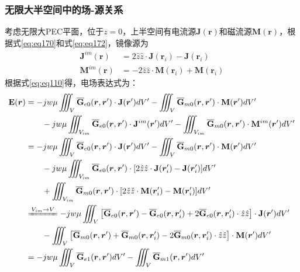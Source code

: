 \documentclass{article}
\numberwithin{equation}{section}
\renewcommand{\vec}[1]{\boldsymbol{#1}}
\begin{document}
\subsubsection{无限大半空间中的场-源关系}
考虑无限大PEC平面，位于$z=0$，上半空间有电流源$\mathbf{J}(\vec{r})$和磁流源$\mathbf{M}(\vec{r})$，根据式\ref{eq:eq170}和式\ref{eq:eq172}，镜像源为
\begin{align}
    \label{eq:eq177}
    \mathbf{J}^{im}(\vec{r})&=2\hat{z}\hat{z}\cdot\mathbf{J}(\vec{r}_i)-\mathbf{J}(\vec{r}_i) \\
    \label{eq:eq178}
    \mathbf{M}^{im}(\vec{r})&=-2\hat{z}\hat{z}\cdot\mathbf{M}(\vec{r}_i)+\mathbf{M}(\vec{r}_i)
\end{align}
根据式\ref{eq:eq110}得，电场表达式为：
\begin{align}
    \label{eq:eq179}
    \mathbf{E}(\vec{r})&=-jw\mu\iiint_V\overline{\mathbf{G}}_{e0}(\vec{r},\vec{r}')\cdot \mathbf{J}(\vec{r}')dV'-\iiint_V\overline{\mathbf{G}}_{m0}(\vec{r},\vec{r}')\cdot \mathbf{M}(\vec{r}')dV' \nonumber \\
                       &\qquad-jw\mu\iiint_{V_{im}}\overline{\mathbf{G}}_{e0}(\vec{r},\vec{r}')\cdot \mathbf{J}^{im}(\vec{r}')dV'-\iiint_{V_{im}}\overline{\mathbf{G}}_{m0}(\vec{r},\vec{r}')\cdot \mathbf{M}^{im}(\vec{r}')dV' \nonumber \\
                       &=-jw\mu\iiint_V\overline{\mathbf{G}}_{e0}(\vec{r},\vec{r}')\cdot \mathbf{J}(\vec{r}')dV'-\iiint_V\overline{\mathbf{G}}_{m0}(\vec{r},\vec{r}')\cdot \mathbf{M}(\vec{r}')dV' \nonumber \\
                       &\qquad-jw\mu\iiint_{V_{im}}\overline{\mathbf{G}}_{e0}(\vec{r},\vec{r}')\cdot [2\hat{z}\hat{z}\cdot\mathbf{J}(\vec{r}'_i)-\mathbf{J}(\vec{r}'_i)]dV' \nonumber \\
                       &\qquad+\iiint_{V_{im}}\overline{\mathbf{G}}_{m0}(\vec{r},\vec{r}')\cdot [2\hat{z}\hat{z}\cdot\mathbf{M}(\vec{r}'_i)-\mathbf{M}(\vec{r}'_i)]dV' \nonumber \\
                       &\xlongequal{V_{im}\to V}-jw\mu\iiint_V\left[\overline{\mathbf{G}}_{e0}(\vec{r},\vec{r}')-\overline{\mathbf{G}}_{e0}(\vec{r},\vec{r}'_i)+2\overline{\mathbf{G}}_{e0}(\vec{r},\vec{r}'_i)\cdot\hat{z}\hat{z}\right]\cdot\mathbf{J}(\vec{r}')dV' \nonumber \\
                       &\qquad-\iiint_V\left[\overline{\mathbf{G}}_{m0}(\vec{r},\vec{r}')+\overline{\mathbf{G}}_{m0}(\vec{r},\vec{r}'_i)-2\overline{\mathbf{G}}_{m0}(\vec{r},\vec{r}'_i)\cdot\hat{z}\hat{z}\right]\cdot\mathbf{M}(\vec{r}')dV' \nonumber \\
                       &=-jw\mu\iiint_V\overline{\mathbf{G}}_{e1}(\vec{r},\vec{r}')dV'-\iiint_V\overline{\mathbf{G}}_{m1}(\vec{r},\vec{r}')dV'
\end{align}
\end{document}
